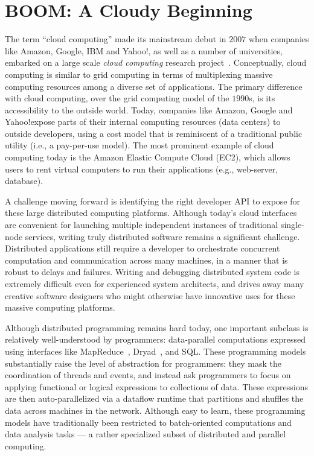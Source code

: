 \chapter[BOOM: A Cloudy Beginning]{BOOM: A Cloudy Beginning}
\label{ch:cloud}

The term ``cloud computing'' made its mainstream debut in $2007$ when companies
like Amazon, Google, IBM and Yahoo!, as well as a number of universities,
embarked on a large scale {\em cloud computing} research project~\cite{lohr}.
Conceptually, cloud computing is similar to grid computing in terms of
multiplexing massive computing resources among a diverse set of applications.
The primary difference with cloud computing, over the grid computing model of
the $1990$s, is its accessibility to the outside world.  Today, companies like
Amazon, Google and Yahoo!\@ expose parts of their internal computing resources
(data centers) to outside developers, using a cost model that is reminiscent of
a traditional public utility (i.e., a pay-per-use model).  The most prominent
example of cloud computing today is the Amazon Elastic Compute Cloud (EC2),
which allows users to rent virtual computers to run their applications (e.g.,
web-server, database).

A challenge moving forward is identifying the right developer API to expose for
these large distributed computing platforms.  Although today's cloud interfaces
are convenient for launching multiple independent instances of traditional
single-node services, writing truly distributed software remains a significant
challenge.  Distributed applications still require a developer to orchestrate
concurrent computation and communication across many machines, in a manner that
is robust to delays and failures.  Writing and debugging distributed system
code is extremely difficult even for experienced system architects, and drives
away many creative software designers who might otherwise have innovative uses
for these massive computing platforms.

Although distributed programming remains hard today, one important subclass is
relatively well-understood by programmers: data-parallel computations expressed
using interfaces like MapReduce~\cite{mapreduce-osdi}, Dryad~\cite{dryad}, and
SQL\@.  These programming models substantially raise the level of abstraction
for programmers: they mask the coordination of threads and events, and instead
ask programmers to focus on applying functional or logical expressions to
collections of data.  These expressions are then auto-parallelized via a
dataflow runtime that partitions and shuffles the data across machines in the
network.  Although easy to learn, these programming models have traditionally
been restricted to batch-oriented computations and data analysis tasks --- a
rather specialized subset of distributed and parallel computing.

